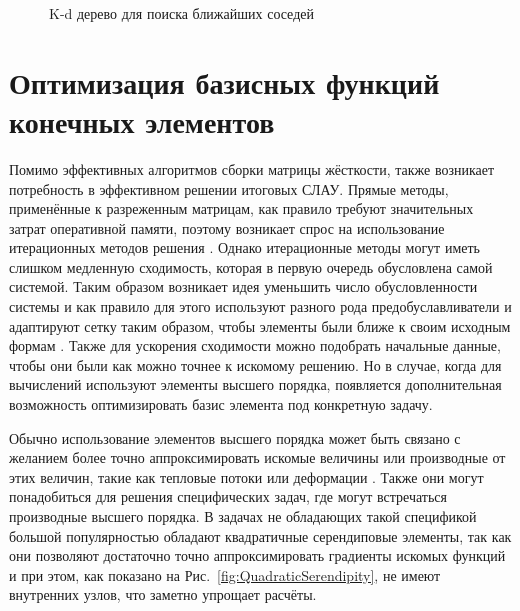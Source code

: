 \begin{figure}[ht]
    \caption{K-d дерево для поиска ближайших соседей}\label{fig:SearchNeighbours}
\end{figure}

\section{Оптимизация базисных функций конечных элементов}\label{sec:ProgramComplex/BasisOptimization}

Помимо эффективных алгоритмов сборки матрицы жёсткости, также возникает потребность в эффективном решении итоговых СЛАУ. Прямые методы, применённые к разреженным матрицам, как правило требуют значительных затрат оперативной памяти, поэтому возникает спрос на использование итерационных методов решения \cite{Demmel}. Однако итерационные методы могут иметь слишком медленную сходимость, которая в первую очередь обусловлена самой системой. Таким образом возникает идея уменьшить число обусловленности системы и как правило для этого используют разного рода предобуславливатели и адаптируют сетку таким образом, чтобы элементы были ближе к своим исходным формам \cite{MeshOptimization1, MeshOptimization2}. Также для ускорения сходимости можно подобрать начальные данные, чтобы они были как можно точнее к искомому решению. Но в случае, когда для вычислений используют элементы высшего порядка, появляется дополнительная возможность оптимизировать базис элемента под конкретную задачу.

Обычно использование элементов высшего порядка может быть связано с желанием более точно аппроксимировать искомые величины или производные от этих величин, такие как тепловые потоки или деформации \cite{HighOrderElements1, HighOrderElements2}. Также они могут понадобиться для решения специфических задач, где могут встречаться производные высшего порядка. В задачах не обладающих такой спецификой большой популярностью обладают квадратичные серендиповые элементы, так как они позволяют достаточно точно аппроксимировать градиенты искомых функций и при этом, как показано на Рис.~\ref{fig:QuadraticSerendipity}, не имеют внутренних узлов, что заметно упрощает расчёты.

